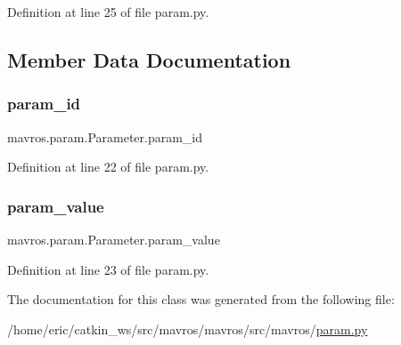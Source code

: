 Definition at line 25 of file param.\+py.



\subsection{Member Data Documentation}
\mbox{\label{classmavros_1_1param_1_1Parameter_ad7662fefa22c2bc13f28338838fe77ce}} 
\subsubsection{\texorpdfstring{param\_id}{param\_id}}
{\footnotesize\ttfamily mavros.\+param.\+Parameter.\+param\+\_\+id}



Definition at line 22 of file param.\+py.

\mbox{\label{classmavros_1_1param_1_1Parameter_a7cb16638f293dd3702452ddb03ac1222}} 
\subsubsection{\texorpdfstring{param\_value}{param\_value}}
{\footnotesize\ttfamily mavros.\+param.\+Parameter.\+param\+\_\+value}



Definition at line 23 of file param.\+py.



The documentation for this class was generated from the following file\+:\begin{DoxyCompactItemize}
\item 
/home/eric/catkin\+\_\+ws/src/mavros/mavros/src/mavros/\mbox{\hyperlink{param_8py}{param.\+py}}\end{DoxyCompactItemize}
